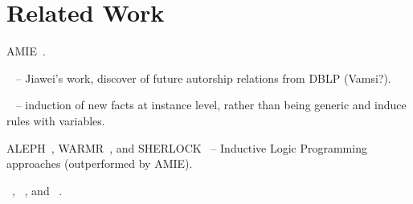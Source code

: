 \section{Related Work}
AMIE~\cite{galarraga2015fast}.

~\cite{zhu2011mining} -- Jiawei's work, discover of future autorship relations from DBLP (Vamsi?).

~\cite{abedjan2014amending} -- induction of new facts at instance level, rather than being generic and induce rules with variables.

ALEPH~\cite{muggleton1995inverse}, WARMR~\cite{dehaspe1999discovery}, and SHERLOCK~\cite{schoenmackers2010learning} -- Inductive Logic Programming approaches (outperformed by AMIE).

\yago~\cite{suchanek2007yago}, \dbpedia~\cite{bizer2009dbpedia}, and \wikidata~\cite{vrandevcic2014wikidata}.